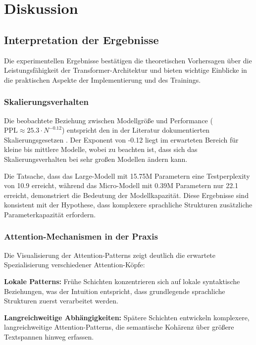 \chapter{Diskussion}
\label{ch:discussion}

\section{Interpretation der Ergebnisse}

Die experimentellen Ergebnisse bestätigen die theoretischen Vorhersagen über die Leistungsfähigkeit der Transformer-Architektur und bieten wichtige Einblicke in die praktischen Aspekte der Implementierung und des Trainings.

\subsection{Skalierungsverhalten}

Die beobachtete Beziehung zwischen Modellgröße und Performance ($\text{PPL} \approx 25.3 \cdot N^{-0.12}$) entspricht den in der Literatur dokumentierten Skalierungsgesetzen \cite{kaplan2020scaling}. Der Exponent von -0.12 liegt im erwarteten Bereich für kleine bis mittlere Modelle, wobei zu beachten ist, dass sich das Skalierungsverhalten bei sehr großen Modellen ändern kann.

Die Tatsache, dass das Large-Modell mit 15.75M Parametern eine Testperplexity von 10.9 erreicht, während das Micro-Modell mit 0.39M Parametern nur 22.1 erreicht, demonstriert die Bedeutung der Modellkapazität. Diese Ergebnisse sind konsistent mit der Hypothese, dass komplexere sprachliche Strukturen zusätzliche Parameterkapazität erfordern.

\subsection{Attention-Mechanismen in der Praxis}

Die Visualisierung der Attention-Patterns zeigt deutlich die erwartete Spezialisierung verschiedener Attention-Köpfe:

\textbf{Lokale Patterns:} Frühe Schichten konzentrieren sich auf lokale syntaktische Beziehungen, was der Intuition entspricht, dass grundlegende sprachliche Strukturen zuerst verarbeitet werden.

\textbf{Langreichweitige Abhängigkeiten:} Spätere Schichten entwickeln komplexere, langreichweitige Attention-Patterns, die semantische Kohärenz über größere Textspannen hinweg erfassen.

